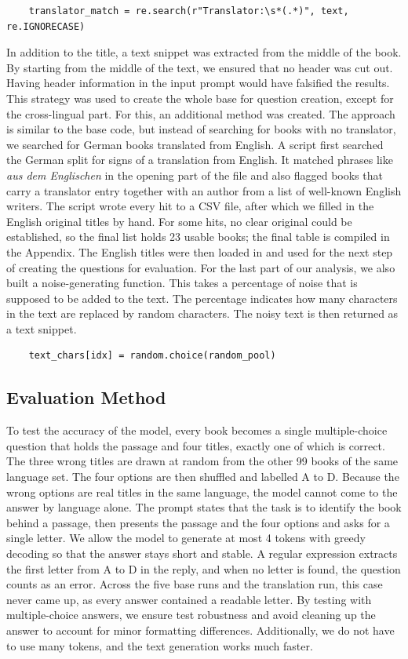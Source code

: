 \documentclass[11pt]{article}
\begin{document}
\begin{verbatim}
    translator_match = re.search(r"Translator:\s*(.*)", text, re.IGNORECASE)
\end{verbatim}

In addition to the title, a text snippet was extracted from the middle of the book. By starting from the middle of the text, we ensured that no header was cut out. Having header information in the input prompt would have falsified the results. 
This strategy was used to create the whole base for question creation, except for the cross-lingual part. For this, an additional method was created. The approach is similar to the base code, but instead of searching for books with no translator, we searched for German books translated from English. A script first searched the German split for signs of a translation from English. It matched phrases like \textit{aus dem Englischen} in the opening part of the file and also flagged books that carry a translator entry together with an author from a list of well-known English writers. The script wrote every hit to a CSV file, after which we filled in the English original titles by hand. For some hits, no clear original could be established, so the final list holds 23 usable books; the final table is compiled in the Appendix. The English titles were then loaded in and used for the next step of creating the questions for evaluation.  
For the last part of our analysis, we also built a noise-generating function. This takes a percentage of noise that is supposed to be added to the text. The percentage indicates how many characters in the text are replaced by random characters. The noisy text is then returned as a text snippet.
\begin{verbatim}
    text_chars[idx] = random.choice(random_pool)
\end{verbatim}

\subsection{Evaluation Method}
To test the accuracy of the model, every book becomes a single multiple-choice question that holds the passage and four titles, exactly one of which is correct. The three wrong titles are drawn at random from the other 99 books of the same language set. The four options are then shuffled and labelled A to D. Because the wrong options are real titles in the same language, the model cannot come to the answer by language alone. The prompt states that the task is to identify the book behind a passage, then presents the passage and the four options and asks for a single letter. We allow the model to generate at most 4 tokens with greedy decoding so that the answer stays short and stable. A regular expression extracts the first letter from A to D in the reply, and when no letter is found, the question counts as an error. Across the five base runs and the translation run, this case never came up, as every answer contained a readable letter. By testing with multiple-choice answers, we ensure test robustness and avoid cleaning up the answer to account for minor formatting differences. Additionally, we do not have to use many tokens, and the text generation works much faster. 
\end{document}
